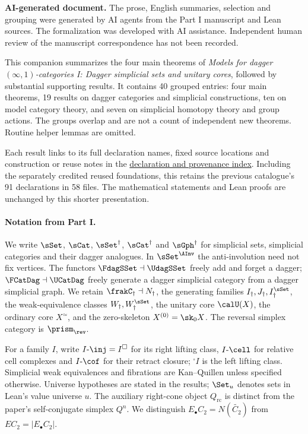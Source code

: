 \noindent\textbf{AI-generated document.}
The prose, English summaries, selection and grouping were generated by AI agents from the Part I manuscript and Lean sources.
The formalization was developed with AI assistance.
Independent human review of the manuscript correspondence has not been recorded.

\medskip
This companion summarizes the four main theorems of
\emph{Models for dagger $(\infty,1)$-categories I: Dagger simplicial sets and unitary cores},
followed by substantial supporting results.
It contains 40 grouped entries:
four main theorems,
19 results on dagger categories and simplicial constructions,
ten on model category theory,
and seven on simplicial homotopy theory and group actions.
The groups overlap and are not a count of independent new theorems.
Routine helper lemmas are omitted.

Each result links to its full declaration names, fixed source locations and construction or reuse notes in the
\href{\Repo/blob/\CatalogueTag/docs/formalization-companion/RESULT_INDEX.md}{declaration and provenance index}.
Including the separately credited reused foundations, this retains the previous catalogue's 91 declarations in 58 files.
The mathematical statements and Lean proofs are unchanged by this shorter presentation.

\paragraph{Notation from Part I.}
We write $\sSet$, $\sCat$, $\sSet^{\dag}$, $\sCat^{\dag}$ and $\sGph^{\dag}$ for simplicial sets, simplicial categories and their dagger analogues.
In $\sSet^{\AInv}$ the anti-involution need not fix vertices.
The functors $\FdagSSet\dashv\UdagSSet$ freely add and forget a dagger;
$\FCatDag\dashv\UCatDag$ freely generate a dagger simplicial category from a dagger simplicial graph.
We retain $\frakC_{\dag}\dashv N_{\dag}$, the generating families $I_{\dag},J_{\dag},I^{\sSet}_{\dag}$,
the weak-equivalence classes $W_{\dag},W^{\sSet}_{\dag}$,
the unitary core $\calU(X)$,
the ordinary core $X^{\simeq}$,
and the zero-skeleton $X^{(0)}=\sk_0X$.
The reversal simplex category is $\prism_{\rev}$.

For a family $I$, write $I\text{-}\inj=I^{\square}$ for its right lifting class,
$I\text{-}\cell$ for relative cell complexes and $I\text{-}\cof$ for their retract closure;
${}^{\square}I$ is the left lifting class.
Simplicial weak equivalences and fibrations are Kan--Quillen unless specified otherwise.
Universe hypotheses are stated in the results;
$\Set_u$ denotes sets in Lean's value universe $u$.
The auxiliary right-cone object $Q_{\mathrm{rc}}$ is distinct from the paper's self-conjugate simplex $Q^n$.
We distinguish $E_{\bullet}C_2=N(\widetilde{C_2})$ from $EC_2=|E_{\bullet}C_2|$.

